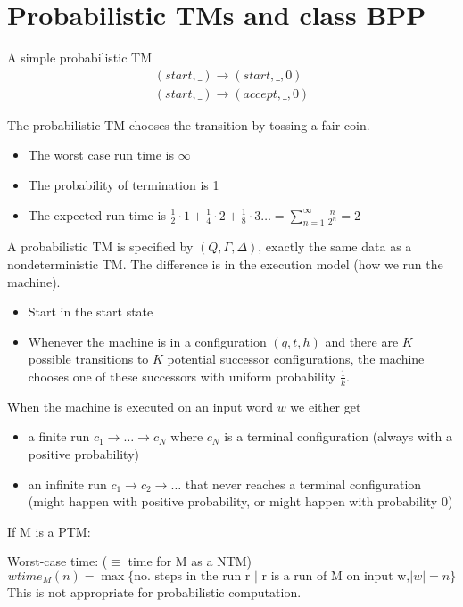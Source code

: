\documentclass[a4paper,12pt]{article}
\theoremstyle{definition}
\theoremstyle{remark}
\begin{document}
\newpage
\section{Probabilistic TMs and class BPP}

A simple probabilistic TM 
\begin{gather*}
    (start, \_) \to (start, \_, 0)  \\
    (start, \_) \to (accept, \_, 0)
\end{gather*}

The probabilistic TM chooses the transition by tossing a fair coin.

\begin{itemize}
    \item The worst case run time is $\infty$
    \item The probability of termination is 1
    \item The expected run time is $\frac{1}{2} \cdot 1 + \frac{1}{4} \cdot 2 + \frac{1}{8} \cdot 3 \dots = \sum_{n = 1}^{\infty} \frac{n}{2^n} = 2$
\end{itemize}

A probabilistic TM is specified by $(Q, \Gamma, \Delta)$, exactly the same data as a nondeterministic TM. The difference is in the execution model
(how we run the machine).
\begin{itemize}
    \item Start in the start state
    \item Whenever the machine is in a configuration $(q, t, h)$ and there are $K$ possible transitions to $K$ potential successor configurations, the machine chooses
    one of these successors with uniform probability $\frac{1}{k}$.
\end{itemize}

When the machine is executed on an input word $w$ we either get
\begin{itemize}
    \item a finite run $c_1 \to \dots \to c_N$ where $c_N$ is a terminal configuration (always with a positive probability)
    \item an infinite run $c_1 \to c_2 \to \dots$ that never reaches a terminal configuration (might happen with positive probability, or might happen with probability $0$)
\end{itemize}

If M is a PTM:

Worst-case time: ($\equiv$ time for M as a NTM)
\begin{equation*}
    wtime_M(n) = \max \{\text{no. steps in the run r | r is a run of M on input w,} |w| = n\}
\end{equation*}
This is not appropriate for probabilistic computation.
\end{document}
